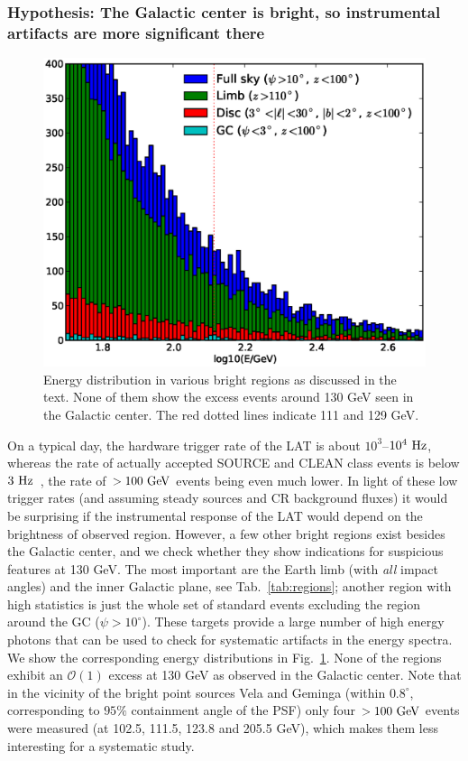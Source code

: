 \documentclass[aps,twocolumn,prd,superscriptaddress,showpacs,nofootinbib,fixfloat]{revtex4}
\newcommand{\Hz}{{\rm ~Hz}}
\newcommand{\GeV}{{\rm ~GeV}}
\begin{document}
\subsubsection{Hypothesis: The Galactic center is bright, so instrumental
artifacts are more significant there}

\begin{figure}
  \centering
  \includegraphics[width=1.0\linewidth]{plots/target_spectra.eps}
  \caption{Energy distribution in various bright regions as discussed in the
  text. None of them show the excess events around 130 GeV seen in the
  Galactic center. The red dotted lines indicate 111 and 129 GeV.}
  \label{fig:target_spectra}
\end{figure}

On a typical day, the hardware trigger rate of the LAT is about
$10^3$--$10^4\Hz$, whereas the rate of actually accepted SOURCE and CLEAN
class events is below $3\Hz$~\citep{1206.1896}, the rate of $>100\GeV$ events
being even much lower. In light of these low trigger rates (and assuming
steady sources and CR background fluxes) it would be surprising if the
instrumental response of the LAT would depend on the brightness of observed
region.  However, a few other bright regions exist besides the Galactic
center, and we check whether they show indications for suspicious features at
130 GeV. The most important are the Earth limb (with \emph{all} impact angles)
and the inner Galactic plane, see Tab.~\ref{tab:regions}; another region with
high statistics is just the whole set of standard events excluding the region
around the GC ($\psi>10^\circ$). These targets provide a large number of high
energy photons that can be used to check for systematic artifacts in the
energy spectra.  We show the corresponding energy distributions in
Fig.~\ref{fig:target_spectra}. None of the regions exhibit an $\mathcal{O}(1)$
excess at 130 GeV as observed in the Galactic center. Note that in the
vicinity of the bright point sources Vela and Geminga (within $0.8^\circ$,
corresponding to $95\%$ containment angle of the PSF) only four $>100\GeV$
events were measured (at 102.5, 111.5, 123.8 and 205.5 GeV), which makes them
less interesting for a systematic study.
\end{document}
